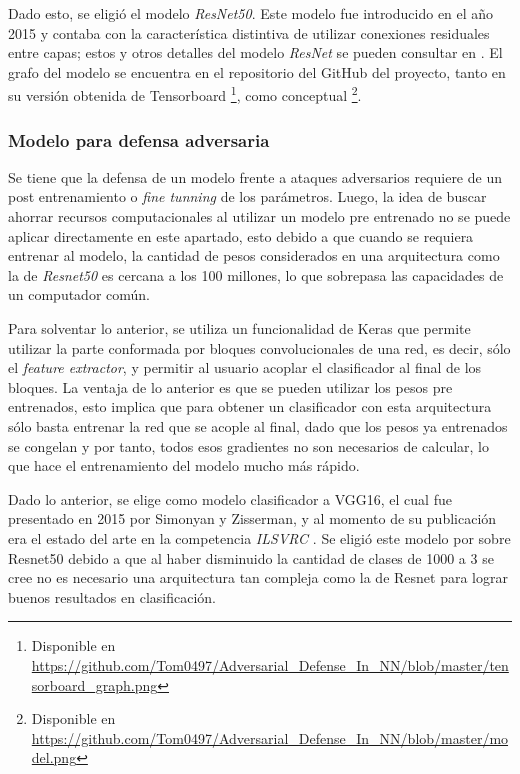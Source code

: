 \documentclass[conference]{IEEEtran}
\begin{document}
Dado esto, se eligió el modelo \textit{ResNet50}. Este modelo fue introducido en el año 2015 y contaba con la característica distintiva de utilizar conexiones residuales entre capas; estos y otros detalles del modelo \textit{ResNet} se pueden consultar en \cite{resnet}. El grafo del modelo se encuentra en el repositorio del GitHub del proyecto, tanto en su versión obtenida de Tensorboard \footnote{Disponible en \url{https://github.com/Tom0497/Adversarial_Defense_In_NN/blob/master/tensorboard_graph.png}}, como conceptual \footnote{Disponible en \url{https://github.com/Tom0497/Adversarial_Defense_In_NN/blob/master/model.png}}.

\subsubsection{Modelo para defensa adversaria}

Se tiene que la defensa de un modelo frente a ataques adversarios requiere de un post entrenamiento o \textit{fine tunning} de los parámetros. Luego, la idea de buscar ahorrar recursos computacionales al utilizar un modelo pre entrenado no se puede aplicar directamente en este apartado, esto debido a que cuando se requiera entrenar al modelo, la cantidad de pesos considerados en una arquitectura como la de \textit{Resnet50} es cercana a los 100 millones, lo que sobrepasa las capacidades de un computador común.

Para solventar lo anterior, se utiliza un funcionalidad de Keras que permite utilizar la parte conformada por bloques convolucionales de una red, es decir, sólo el \textit{feature extractor}, y permitir al usuario acoplar el clasificador al final de los bloques. La ventaja de lo anterior es que se pueden utilizar los pesos pre entrenados, esto implica que para obtener un clasificador con esta arquitectura sólo basta entrenar la red que se acople al final, dado que los pesos ya entrenados se congelan y por tanto, todos esos gradientes no son necesarios de calcular, lo que hace el entrenamiento del modelo mucho más rápido.

Dado lo anterior, se elige como modelo clasificador a VGG16, el cual fue presentado en 2015 por Simonyan
y Zisserman, y al momento de su publicación era el estado del arte en la competencia \textit{ILSVRC} \cite{vgg16}. Se eligió este modelo por sobre Resnet50 debido a que al haber disminuido la cantidad de clases de 1000 a 3 se cree no es necesario una arquitectura tan compleja como la de Resnet para lograr buenos resultados en clasificación.
\end{document}
